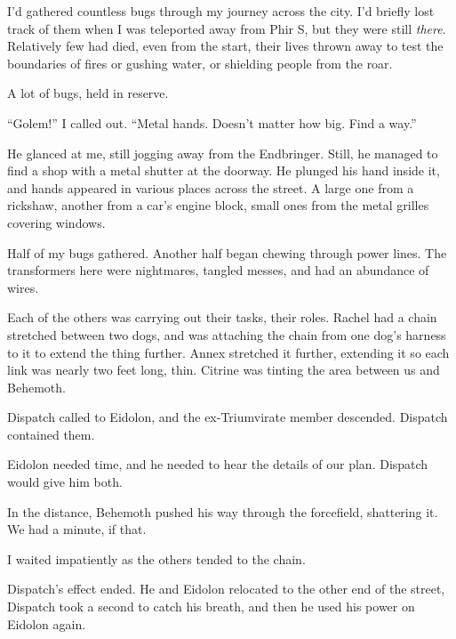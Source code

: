 I'd gathered countless bugs through my journey across the city.  I'd briefly lost track of them when I was teleported away from Phir S, but they were still \emph{there}.  Relatively few had died, even from the start, their lives thrown away to test the boundaries of fires or gushing water, or shielding people from the roar.



A lot of bugs, held in reserve.



``Golem!''  I called out.  ``Metal hands.  Doesn't matter how big.  Find a way.''



He glanced at me, still jogging away from the Endbringer.  Still, he managed to find a shop with a metal shutter at the doorway.  He plunged his hand inside it, and hands appeared in various places across the street.  A large one from a rickshaw, another from a car's engine block, small ones from the metal grilles covering windows.



Half of my bugs gathered.  Another half began chewing through power lines.  The transformers here were nightmares, tangled messes, and had an abundance of wires.



Each of the others was carrying out their tasks, their roles.  Rachel had a chain stretched between two dogs, and was attaching the chain from one dog's harness to it to extend the thing further.  Annex stretched it further, extending it so each link was nearly two feet long, thin.  Citrine was tinting the area between us and Behemoth.



Dispatch called to Eidolon, and the ex-Triumvirate member descended.  Dispatch contained them.



Eidolon needed time, and he needed to hear the details of our plan.  Dispatch would give him both.



In the distance, Behemoth pushed his way through the forcefield, shattering it.  We had a minute, if that.



I waited impatiently as the others tended to the chain.



Dispatch's effect ended.  He and Eidolon relocated to the other end of the street, Dispatch took a second to catch his breath, and then he used his power on Eidolon again.



